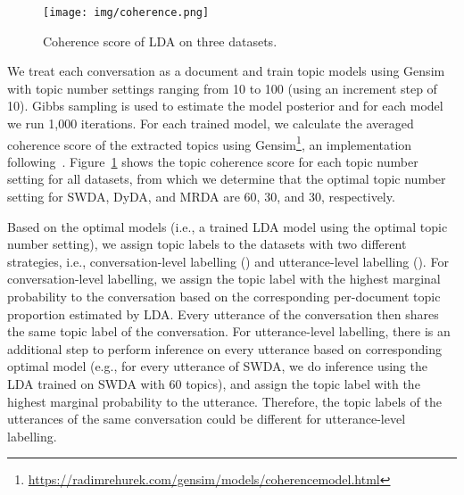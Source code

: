 \documentclass[11pt,a4paper]{article}
\begin{document}
\begin{figure}[tb]
\centering
  \texttt{[image: img/coherence.png]}
\caption{Coherence score of LDA on three datasets.}
  \label{fig:co_per_lda}
\end{figure}




We treat each conversation as a document and train topic models using Gensim with topic number settings ranging from 10 to 100 (using an increment step of 10).  Gibbs sampling is used to estimate the model posterior and for each model we run 1,000 iterations. For each trained model, we calculate the averaged coherence score of the extracted topics using Gensim\footnote{\url{https://radimrehurek.com/gensim/models/coherencemodel.html}}, an implementation following~\cite{roder2015exploring}. Figure~\ref{fig:co_per_lda} shows the topic coherence score for each topic number setting for all datasets, from which we determine that the optimal topic number setting for SWDA, DyDA, and MRDA are 60, 30, and 30, respectively. 

Based on the optimal models (i.e., a trained LDA model using the optimal topic number setting), we assign topic labels to the datasets with two different strategies, i.e., conversation-level labelling () and utterance-level labelling (). For conversation-level labelling, we assign the topic label with the highest marginal probability to the conversation based on the corresponding per-document topic proportion estimated by LDA. Every utterance of the conversation then shares the same topic label of the conversation. For utterance-level labelling, there is an additional step to perform inference on every utterance based on corresponding optimal model (e.g., for every utterance of SWDA, we do inference using the LDA trained on SWDA with 60 topics), and assign the topic label with the highest marginal probability to the utterance. Therefore, the topic labels of the utterances of the same conversation could be different for utterance-level labelling. 





\begin{table}[tb]
  \caption{ is the number of DA classes,  is the number of 
manually labelled conversation-level topic classes,  is the vocabulary size. Training, Validation and Testing indicate the number of conversations/utterances in the respective splits.}
  \label{T:datasets}
\end{table}
\end{document}
